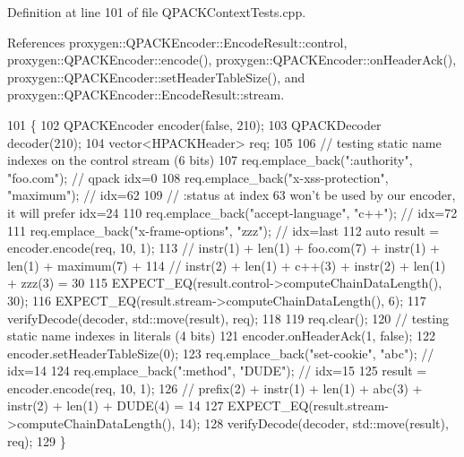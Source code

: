Definition at line 101 of file Q\+P\+A\+C\+K\+Context\+Tests.\+cpp.



References proxygen\+::\+Q\+P\+A\+C\+K\+Encoder\+::\+Encode\+Result\+::control, proxygen\+::\+Q\+P\+A\+C\+K\+Encoder\+::encode(), proxygen\+::\+Q\+P\+A\+C\+K\+Encoder\+::on\+Header\+Ack(), proxygen\+::\+Q\+P\+A\+C\+K\+Encoder\+::set\+Header\+Table\+Size(), and proxygen\+::\+Q\+P\+A\+C\+K\+Encoder\+::\+Encode\+Result\+::stream.


\begin{DoxyCode}
101                                          \{
102   QPACKEncoder encoder(\textcolor{keyword}{false}, 210);
103   QPACKDecoder decoder(210);
104   vector<HPACKHeader> req;
105 
106   \textcolor{comment}{// testing static name indexes on the control stream (6 bits)}
107   req.emplace\_back(\textcolor{stringliteral}{":authority"}, \textcolor{stringliteral}{"foo.com"}); \textcolor{comment}{// qpack idx=0}
108   req.emplace\_back(\textcolor{stringliteral}{"x-xss-protection"}, \textcolor{stringliteral}{"maximum"}); \textcolor{comment}{// idx=62}
109   \textcolor{comment}{// :status at index 63 won't be used by our encoder, it will prefer idx=24}
110   req.emplace\_back(\textcolor{stringliteral}{"accept-language"}, \textcolor{stringliteral}{"c++"}); \textcolor{comment}{// idx=72}
111   req.emplace\_back(\textcolor{stringliteral}{"x-frame-options"}, \textcolor{stringliteral}{"zzz"}); \textcolor{comment}{// idx=last}
112   \textcolor{keyword}{auto} result = encoder.encode(req, 10, 1);
113   \textcolor{comment}{// instr(1) + len(1) + foo.com(7) + instr(1) + len(1) + maximum(7) +}
114   \textcolor{comment}{// instr(2) + len(1) + c++(3) + instr(2) + len(1) + zzz(3) = 30}
115   EXPECT\_EQ(result.control->computeChainDataLength(), 30);
116   EXPECT\_EQ(result.stream->computeChainDataLength(), 6);
117   verifyDecode(decoder, std::move(result), req);
118 
119   req.clear();
120   \textcolor{comment}{// testing static name indexes in literals (4 bits)}
121   encoder.onHeaderAck(1, \textcolor{keyword}{false});
122   encoder.setHeaderTableSize(0);
123   req.emplace\_back(\textcolor{stringliteral}{"set-cookie"}, \textcolor{stringliteral}{"abc"}); \textcolor{comment}{// idx=14}
124   req.emplace\_back(\textcolor{stringliteral}{":method"}, \textcolor{stringliteral}{"DUDE"}); \textcolor{comment}{// idx=15}
125   result = encoder.encode(req, 10, 1);
126   \textcolor{comment}{// prefix(2) + instr(1) + len(1) + abc(3) + instr(2) + len(1) + DUDE(4) = 14}
127   EXPECT\_EQ(result.stream->computeChainDataLength(), 14);
128   verifyDecode(decoder, std::move(result), req);
129 \}
\end{DoxyCode}
